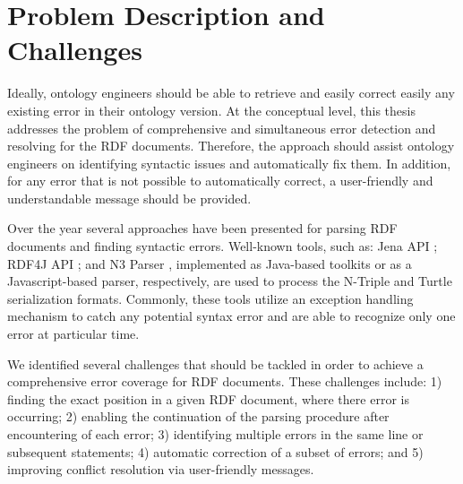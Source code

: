 \section{Problem Description and Challenges} 	
Ideally, ontology engineers should be able to retrieve and easily correct easily any existing error in their ontology version.
At the conceptual level, this thesis addresses the problem of comprehensive and simultaneous error detection and resolving for the RDF documents.
Therefore, the approach should assist ontology engineers on identifying syntactic issues and automatically fix them.
In addition, for any error that is not possible to automatically correct, a user-friendly and understandable message should be provided.

Over the year several approaches have been presented for parsing RDF documents and finding syntactic errors.
Well-known tools, such as: Jena API \cite{McBride:2002:JSW:613357.613755}; RDF4J API \cite{RDF4J:Online}; and N3 Parser \cite{N3Parser:Online}, implemented as Java-based toolkits or as a Javascript-based parser, respectively, are used to process the N-Triple and Turtle serialization formats. 
Commonly, these tools utilize an exception handling mechanism to catch any potential syntax error and are able to recognize only one error at particular time.

We identified several challenges that should be tackled in order to achieve a comprehensive error coverage for RDF documents.
These challenges include: 1) finding the exact position in a given RDF document, where there error is occurring; 2) enabling the continuation of the parsing procedure after encountering of each error; 3) identifying multiple errors in the same line or subsequent statements; 4) automatic correction of a subset of errors; and 5) improving conflict resolution via user-friendly messages.


